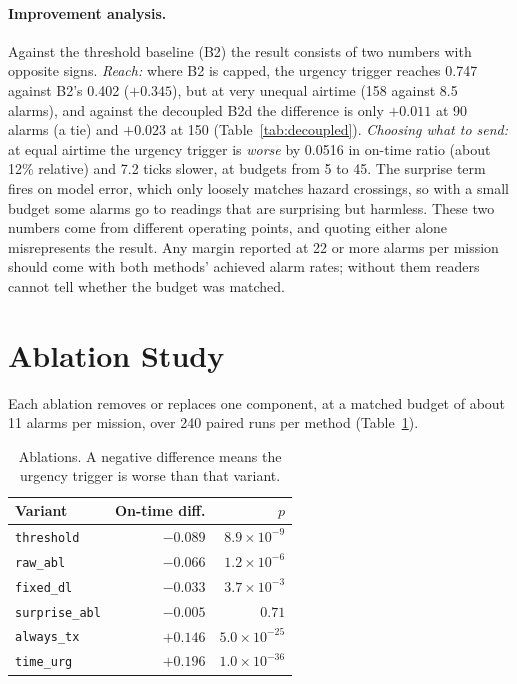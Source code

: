 \documentclass[pdflatex,sn-mathphys-num,iicol]{sn-jnl}
\theoremstyle{thmstyleone}
\theoremstyle{thmstyletwo}
\theoremstyle{thmstylethree}
\begin{document}
\paragraph{Improvement analysis.} Against the threshold baseline (B2) the result consists
of two numbers with opposite signs. \emph{Reach:} where B2 is capped, the urgency trigger reaches
0.747 against B2's 0.402 ($+0.345$), but at very unequal airtime (158 against 8.5 alarms),
and against the decoupled B2d the difference is only $+0.011$ at 90 alarms (a tie) and
$+0.023$ at 150 (Table~\ref{tab:decoupled}). \emph{Choosing what to send:} at equal
airtime the urgency trigger is \emph{worse} by 0.0516 in on-time ratio (about 12\% relative)
and 7.2 ticks slower, at budgets from 5 to 45. The surprise term fires on model error,
which only loosely matches hazard crossings, so with a small budget some alarms go to
readings that are surprising but harmless. These two numbers come from different operating
points, and quoting either alone misrepresents the result. Any margin reported at 22 or
more alarms per mission should come with both methods' achieved alarm rates; without them
readers cannot tell whether the budget was matched.

\section{Ablation Study}\label{sec:ablation}

Each ablation removes or replaces one component, at a matched budget of about 11 alarms per
mission, over 240 paired runs per method (Table~\ref{tab:ablation}).

\begin{table}[t]
\caption{Ablations. A negative difference means the urgency trigger is worse than that
variant.}\label{tab:ablation}
\centering
\footnotesize
\setlength{\tabcolsep}{3pt}
\begin{tabular}{@{}lrr@{}}
\toprule
\textbf{Variant} & \textbf{On-time diff.} & \textbf{$p$} \\
\midrule
\texttt{threshold} & $-0.089$ & $8.9\times10^{-9}$ \\
\texttt{raw\_abl} & $-0.066$ & $1.2\times10^{-6}$ \\
\texttt{fixed\_dl} & $-0.033$ & $3.7\times10^{-3}$ \\
\texttt{surprise\_abl} & $-0.005$ & $0.71$ \\
\texttt{always\_tx} & $+0.146$ & $5.0\times10^{-25}$ \\
\texttt{time\_urg} & $+0.196$ & $1.0\times10^{-36}$ \\
\bottomrule
\end{tabular}
\end{table}
\end{document}
